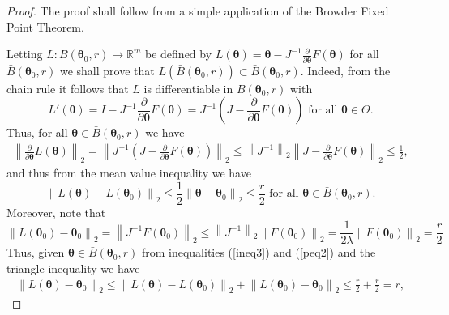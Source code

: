 \documentclass[lineno]{biometrika}
\newcommand{\bs}{\boldsymbol}
\begin{document}
 \begin{proof} The proof shall follow from a simple application of the Browder Fixed Point Theorem.

Letting $L:\bar{B}(\bs{\theta}_0,r)\to \mathbb{R}^m$ be defined by
$L(\bs{\theta})=\bs{\theta}-J^{-1} \frac{\partial}{\partial \bs{\theta}} F(\bs{\theta})$ for all $\bar{B}(\bs{\theta}_0,r)$
we shall prove that $L(\bar{B}(\bs{\theta}_0,r))\subset \bar{B}(\bs{\theta}_0,r)$. Indeed, from the chain rule it follows that $L$ is differentiable in $\bar{B}(\bs{\theta}_0,r)$ with
\begin{equation*}
L'(\bs{\theta})=I-J^{-1} \frac{\partial}{\partial \bs{\theta}}F(\bs{\theta})=J^{-1}\left(J-\frac{\partial}{\partial \bs{\theta}} F(\bs{\theta})\right)\mbox{ for all }\bs{\theta}\in \Theta.
\end{equation*}
Thus, for all $\bs{\theta}\in \bar{B}(\bs{\theta}_0,r)$ we have
\begin{equation*}
\begin{aligned}
\label{peq1}
\left\|\frac{\partial}{\partial \bs{\theta}} L(\bs{\theta})\right\|_2=\left\|J^{-1}\left(J-\frac{\partial}{\partial \bs{\theta}} F(\bs{\theta})\right)\right\|_2\leq \left\|J^{-1}\right\|_2\left\|J-\frac{\partial}{\partial \bs{\theta}} F(\bs{\theta})\right\|_2\leq \frac{1}{2},
\end{aligned}
\end{equation*}
and thus from the mean value inequality we have
\begin{equation}\label{ineq3}
\left\|L(\bs{\theta})-L(\bs{\theta}_0)\right\|_2\leq \frac{1}{2} \left\|\bs{\theta}-\bs{\theta}_0\right\|_2\leq \frac{r}{2}\mbox{ for all }\bs{\theta}\in \bar{B}(\bs{\theta}_0,r).
\end{equation}
Moreover, note that
\begin{equation}\label{peq2}\left\|L(\bs{\theta}_0)-\bs{\theta}_0\right\|_2=\left\|J^{-1}F(\bs{\theta}_0)\right\|_2\leq \left\|J^{-1}\right\|_2\left\|F(\bs{\theta}_0)\right\|_2 =\frac{1}{2\lambda}\left\|F(\bs{\theta}_0)\right\|_2=\frac{r}{2}
\end{equation}
Thus, given $\bs{\theta}\in \bar{B}(\bs{\theta}_0,r)$ from inequalities (\ref{ineq3}) and  (\ref{peq2}) and the triangle inequality we have
\begin{equation*}
\begin{aligned}
\left\|L(\bs{\theta})-\bs{\theta}_0\right\|_2\leq \left\|L(\bs{\theta})-L(\bs{\theta}_0)\right\|_2+\left\|L(\bs{\theta}_0)-\bs{\theta}_0\right\|_2\leq \frac{r}{2}+\frac{r}{2}= r,
\end{aligned}

\end{equation*}
\end{proof}
\end{document}
